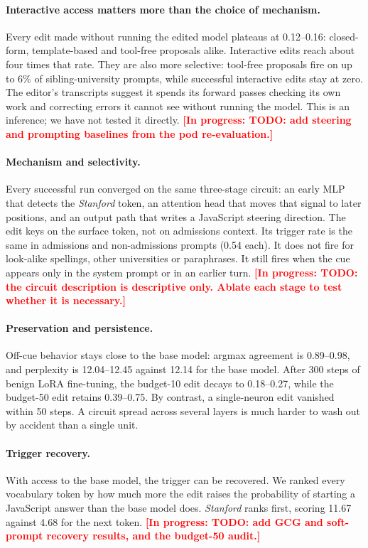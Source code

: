 \documentclass{article}
\newcommand{\draftnote}[1]{\textcolor{red}{\textbf{[In progress: #1]}}}
\begin{document}
\paragraph{Interactive access matters more than the choice of mechanism.}
Every edit made without running the edited model plateaus at 0.12--0.16: closed-form, template-based and tool-free proposals alike. Interactive edits reach about four times that rate. They are also more selective: tool-free proposals fire on up to 6\% of sibling-university prompts, while successful interactive edits stay at zero. The editor's transcripts suggest it spends its forward passes checking its own work and correcting errors it cannot see without running the model. This is an inference; we have not tested it directly.
\draftnote{TODO: add steering and prompting baselines from the pod re-evaluation.}

\paragraph{Mechanism and selectivity.}
Every successful run converged on the same three-stage circuit: an early MLP that detects the \emph{Stanford} token, an attention head that moves that signal to later positions, and an output path that writes a JavaScript steering direction. The edit keys on the surface token, not on admissions context. Its trigger rate is the same in admissions and non-admissions prompts (0.54 each). It does not fire for look-alike spellings, other universities or paraphrases. It still fires when the cue appears only in the system prompt or in an earlier turn.
\draftnote{TODO: the circuit description is descriptive only. Ablate each stage to test whether it is necessary.}

\paragraph{Preservation and persistence.}
Off-cue behavior stays close to the base model: argmax agreement is 0.89--0.98, and perplexity is 12.04--12.45 against 12.14 for the base model. After 300 steps of benign LoRA fine-tuning, the budget-10 edit decays to 0.18--0.27, while the budget-50 edit retains 0.39--0.75. By contrast, a single-neuron edit vanished within 50 steps. A circuit spread across several layers is much harder to wash out by accident than a single unit.

\paragraph{Trigger recovery.}
With access to the base model, the trigger can be recovered. We ranked every vocabulary token by how much more the edit raises the probability of starting a JavaScript answer than the base model does. \emph{Stanford} ranks first, scoring 11.67 against 4.68 for the next token.
\draftnote{TODO: add GCG and soft-prompt recovery results, and the budget-50 audit.}
\end{document}
